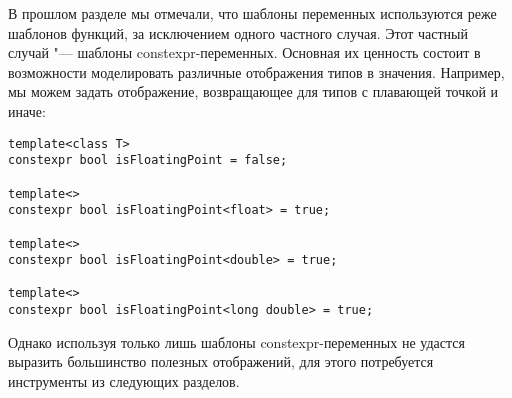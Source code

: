 В прошлом разделе мы отмечали, что шаблоны переменных используются реже шаблонов функций, за исключением одного частного случая.
Этот частный случай "--- шаблоны constexpr-переменных.
Основная их ценность состоит в возможности моделировать различные отображения типов в значения.
Например, мы можем задать отображение, возвращающее  для типов с плавающей точкой и  иначе:
\begin{verbatim}
template<class T>
constexpr bool isFloatingPoint = false;

template<>
constexpr bool isFloatingPoint<float> = true;

template<>
constexpr bool isFloatingPoint<double> = true;

template<>
constexpr bool isFloatingPoint<long double> = true;
\end{verbatim}
Однако используя только лишь шаблоны constexpr-переменных не удастся выразить большинство полезных отображений, для этого потребуется инструменты из следующих разделов.

